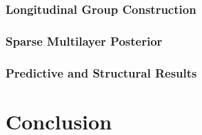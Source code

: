 \documentclass{article}
\begin{document}
\subsubsection{Longitudinal Group Construction}
\label{sec:real_groups}

%
%


\subsubsection{Sparse Multilayer Posterior}
\label{sec:real_sparse_mlp}

%
%
%
%
%


\subsubsection{Predictive and Structural Results}
\label{sec:real_results}

%
%



\section{Conclusion}
\label{sec:conclusion}

%
%
%
%
%
\end{document}

